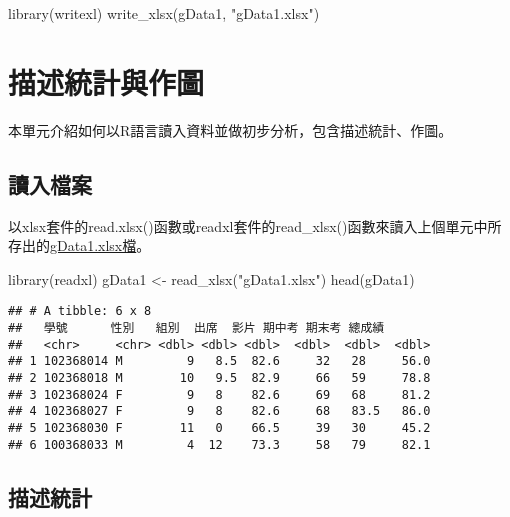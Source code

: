 \documentclass[
]{book}
\newenvironment{Shaded}{\begin{snugshade}}{\end{snugshade}}
\newcommand{\FunctionTok}[1]{\textcolor[rgb]{0.00,0.00,0.00}{#1}}
\newcommand{\NormalTok}[1]{#1}
\newcommand{\OtherTok}[1]{\textcolor[rgb]{0.56,0.35,0.01}{#1}}
\newcommand{\StringTok}[1]{\textcolor[rgb]{0.31,0.60,0.02}{#1}}
\begin{document}
\begin{Shaded}
\begin{Highlighting}[]
\FunctionTok{library}\NormalTok{(writexl)}
\FunctionTok{write\_xlsx}\NormalTok{(gData1, }\StringTok{"gData1.xlsx"}\NormalTok{)}
\end{Highlighting}
\end{Shaded}

\hypertarget{descriptivestats}{%
\chapter{描述統計與作圖}\label{descriptivestats}}

本單元介紹如何以R語言讀入資料並做初步分析，包含描述統計、作圖。

\hypertarget{ux8b80ux5165ux6a94ux6848-1}{%
\section{讀入檔案}\label{ux8b80ux5165ux6a94ux6848-1}}

以xlsx套件的read.xlsx()函數或readxl套件的read\_xlsx()函數來讀入上個單元中所存出的\href{https://docs.google.com/spreadsheets/d/1qx6T0brgzuigBpS0p-Wq8hVSFFku9ebV/edit\#gid=390389518}{gData1.xlsx檔}。

\begin{Shaded}
\begin{Highlighting}[]
\FunctionTok{library}\NormalTok{(readxl)}
\NormalTok{gData1 }\OtherTok{\textless{}{-}} \FunctionTok{read\_xlsx}\NormalTok{(}\StringTok{"gData1.xlsx"}\NormalTok{)}
\FunctionTok{head}\NormalTok{(gData1)}
\end{Highlighting}
\end{Shaded}

\begin{verbatim}
## # A tibble: 6 x 8
##   學號      性別   組別  出席  影片 期中考 期末考 總成績
##   <chr>     <chr> <dbl> <dbl> <dbl>  <dbl>  <dbl>  <dbl>
## 1 102368014 M         9   8.5  82.6     32   28     56.0
## 2 102368018 M        10   9.5  82.9     66   59     78.8
## 3 102368024 F         9   8    82.6     69   68     81.2
## 4 102368027 F         9   8    82.6     68   83.5   86.0
## 5 102368030 F        11   0    66.5     39   30     45.2
## 6 100368033 M         4  12    73.3     58   79     82.1
\end{verbatim}

\hypertarget{ux63cfux8ff0ux7d71ux8a08}{%
\section{描述統計}\label{ux63cfux8ff0ux7d71ux8a08}}
\end{document}
